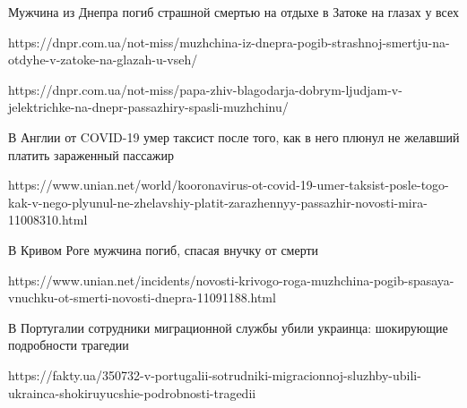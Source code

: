 
Мужчина из Днепра погиб страшной смертью на отдыхе в Затоке на глазах у всех

https://dnpr.com.ua/not-miss/muzhchina-iz-dnepra-pogib-strashnoj-smertju-na-otdyhe-v-zatoke-na-glazah-u-vseh/

https://dnpr.com.ua/not-miss/papa-zhiv-blagodarja-dobrym-ljudjam-v-jelektrichke-na-dnepr-passazhiry-spasli-muzhchinu/

В Англии от COVID-19 умер таксист после того, как в него плюнул не желавший платить зараженный пассажир

https://www.unian.net/world/kooronavirus-ot-covid-19-umer-taksist-posle-togo-kak-v-nego-plyunul-ne-zhelavshiy-platit-zarazhennyy-passazhir-novosti-mira-11008310.html

В Кривом Роге мужчина погиб, спасая внучку от смерти

https://www.unian.net/incidents/novosti-krivogo-roga-muzhchina-pogib-spasaya-vnuchku-ot-smerti-novosti-dnepra-11091188.html

В Португалии сотрудники миграционной службы убили украинца: шокирующие подробности трагедии

https://fakty.ua/350732-v-portugalii-sotrudniki-migracionnoj-sluzhby-ubili-ukrainca-shokiruyucshie-podrobnosti-tragedii
